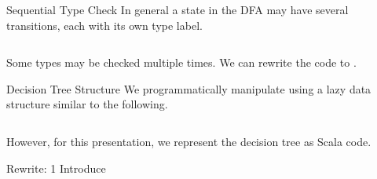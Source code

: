 \newsavebox\typecaseKhbox
\begin{lrbox}{\typecaseKhbox}
  \begin{minipage}{8cm}
    
  \end{minipage}
\end{lrbox}



\begin{frame}{Sequential Type Check}
  In general a state in the DFA may have several  transitions, each with its own type label.
  \begin{columns}
    \begin{column}{0.5\textwidth}
      \usebox\typecaseAbox
    \end{column}
    \begin{column}{0.5\textwidth}  %
      \scalebox{0.9}{}
    \end{column}    
  \end{columns}

  Some types may be checked multiple times.  We can rewrite the code to .
\end{frame}

\begin{frame}{Decision Tree Structure}
  We programmatically manipulate  using a lazy data structure similar to the following.

  \begin{columns}
    \begin{column}{0.5\textwidth}
      \usebox\typecaseAbox
    \end{column}
    \begin{column}{0.5\textwidth}  %
      \usebox\typecaseITEbox
    \end{column}    
  \end{columns}

  However, for this presentation, we represent the decision tree as  Scala code.
\end{frame}



\begin{frame}{Rewrite: 1}
  Introduce \colorbox{pink!30}{}

  \begin{columns}
    \begin{column}{0.5\textwidth}
      \usebox\typecaseAbox
    \end{column}
    \begin{column}{0.5\textwidth}  %
      \usebox\typecaseBabox
    \end{column}    
  \end{columns}
\end{frame}


